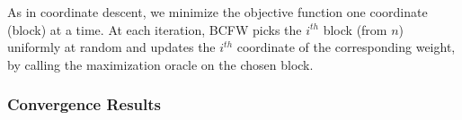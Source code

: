 As in coordinate descent, we minimize the objective function one coordinate
(block) at a time. At each iteration, BCFW picks the $i^{th}$ block (from $n$)
uniformly at random and updates the $i^{th}$ coordinate of the corresponding
weight, by calling the maximization oracle on the chosen block.
\subsubsection*{Convergence Results}




